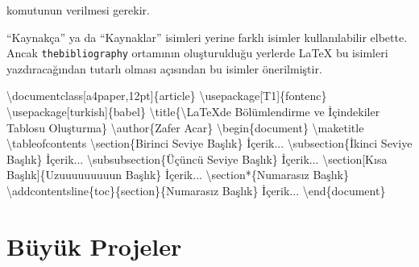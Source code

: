 \documentclass[
  letterpaper,
  DIV=11,
  numbers=noendperiod]{scrreprt}
\newenvironment{Shaded}{\begin{snugshade}}{\end{snugshade}}
\newcommand{\BuiltInTok}[1]{\textcolor[rgb]{0.00,0.23,0.31}{#1}}
\newcommand{\ExtensionTok}[1]{\textcolor[rgb]{0.00,0.23,0.31}{#1}}
\newcommand{\FunctionTok}[1]{\textcolor[rgb]{0.28,0.35,0.67}{#1}}
\newcommand{\KeywordTok}[1]{\textcolor[rgb]{0.00,0.23,0.31}{#1}}
\newcommand{\NormalTok}[1]{\textcolor[rgb]{0.00,0.23,0.31}{#1}}
\begin{document}
komutunun verilmesi gerekir.

\begin{tcolorbox}[enhanced jigsaw, opacitybacktitle=0.6, coltitle=black, leftrule=.75mm, rightrule=.15mm, toprule=.15mm, bottomtitle=1mm, titlerule=0mm, colbacktitle=quarto-callout-note-color!10!white, breakable, arc=.35mm, opacityback=0, colframe=quarto-callout-note-color-frame, toptitle=1mm, title=\textcolor{quarto-callout-note-color}{\faInfo}\hspace{0.5em}{Not}, bottomrule=.15mm, left=2mm, colback=white]
``Kaynakça'' ya da ``Kaynaklar'' isimleri yerine farklı isimler
kullanılabilir elbette. Ancak \texttt{thebibliography} ortamının
oluşturulduğu yerlerde {\LaTeX} bu isimleri yazdıracağından tutarlı
olması açısından bu isimler önerilmiştir.
\end{tcolorbox}

\begin{Shaded}
\begin{Highlighting}[]
\BuiltInTok{\textbackslash{}documentclass}\NormalTok{[a4paper,12pt]\{}\ExtensionTok{article}\NormalTok{\}}
\BuiltInTok{\textbackslash{}usepackage}\NormalTok{[T1]\{}\ExtensionTok{fontenc}\NormalTok{\}}
\BuiltInTok{\textbackslash{}usepackage}\NormalTok{[turkish]\{}\ExtensionTok{babel}\NormalTok{\}}
\FunctionTok{\textbackslash{}title}\NormalTok{\{}\FunctionTok{\textbackslash{}LaTeX}\NormalTok{\textquotesingle{}de Bölümlendirme  ve İçindekiler Tablosu Oluşturma\}}
\FunctionTok{\textbackslash{}author}\NormalTok{\{Zafer Acar\}}
\KeywordTok{\textbackslash{}begin}\NormalTok{\{}\ExtensionTok{document}\NormalTok{\}}
\FunctionTok{\textbackslash{}maketitle}
\FunctionTok{\textbackslash{}tableofcontents}
\KeywordTok{\textbackslash{}section}\NormalTok{\{Birinci Seviye Başlık\}}
\NormalTok{  İçerik...}
\KeywordTok{\textbackslash{}subsection}\NormalTok{\{İkinci Seviye Başlık\}}
\NormalTok{  İçerik...}
\KeywordTok{\textbackslash{}subsubsection}\NormalTok{\{Üçüncü Seviye Başlık\}}
\NormalTok{  İçerik...}
\KeywordTok{\textbackslash{}section}\NormalTok{[Kısa Başlık]\{Uzuuuuuuuuun Başlık\}}
\NormalTok{  İçerik...}
\KeywordTok{\textbackslash{}section*}\NormalTok{\{Numarasız Başlık\}}
\FunctionTok{\textbackslash{}addcontentsline}\NormalTok{\{toc\}\{section\}\{Numarasız Başlık\}}
\NormalTok{  İçerik...}
\KeywordTok{\textbackslash{}end}\NormalTok{\{}\ExtensionTok{document}\NormalTok{\}}
\end{Highlighting}
\end{Shaded}

\hypertarget{buxfcyuxfck-projeler}{%
\section{Büyük Projeler}\label{buxfcyuxfck-projeler}}
\end{document}
